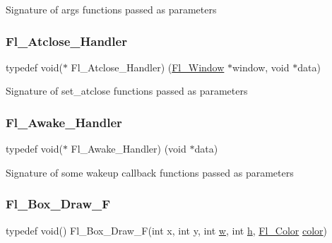 Signature of args functions passed as parameters \mbox{\label{group__callback__functions_gac2b36f6e136744adb3e3ec87e068c169}} 
\subsubsection{\texorpdfstring{Fl\+\_\+\+Atclose\+\_\+\+Handler}{Fl\_Atclose\_Handler}}
{\footnotesize\ttfamily typedef void($\ast$ Fl\+\_\+\+Atclose\+\_\+\+Handler) (\hyperlink{class_fl___window}{Fl\+\_\+\+Window} $\ast$window, void $\ast$data)}

Signature of set\+\_\+atclose functions passed as parameters \mbox{\label{group__callback__functions_ga28b44ff2052ca0b06d0da852fadd42c0}} 
\subsubsection{\texorpdfstring{Fl\+\_\+\+Awake\+\_\+\+Handler}{Fl\_Awake\_Handler}}
{\footnotesize\ttfamily typedef void($\ast$ Fl\+\_\+\+Awake\+\_\+\+Handler) (void $\ast$data)}

Signature of some wakeup callback functions passed as parameters \mbox{\label{group__callback__functions_gacb24a62f521a0e02cd7872a3bfbf3855}} 
\subsubsection{\texorpdfstring{Fl\+\_\+\+Box\+\_\+\+Draw\+\_\+F}{Fl\_Box\_Draw\_F}}
{\footnotesize\ttfamily typedef void() Fl\+\_\+\+Box\+\_\+\+Draw\+\_\+F(int x, int y, int \hyperlink{forms_8_h_aac374e320caaadeca4874add33b62af2}{w}, int \hyperlink{forms_8_h_a7e427ba5b307f9068129699250690066}{h}, \hyperlink{_enumerations_8_h_a8b762953646f8abee866061f1af78a6a}{Fl\+\_\+\+Color} \hyperlink{gl2opengl_8h_a321f1e32cd01131a4f0e10f60a8fcc13}{color})}

